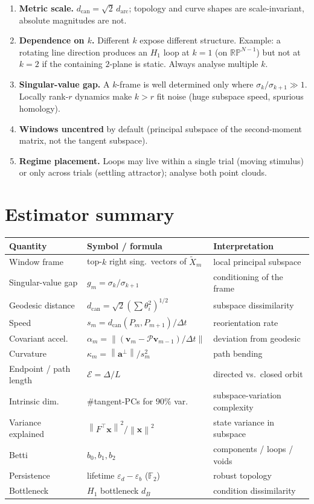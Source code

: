 \documentclass[11pt]{article}
\newcommand{\RP}{\mathbb{RP}}
\newcommand{\Fld}{\mathbb{F}}
\newcommand{\PT}{\mathcal{P}}
\newcommand{\norm}[1]{\left\lVert #1 \right\rVert}
\theoremstyle{definition}
\begin{document}
\begin{enumerate}[leftmargin=1.4em]
\item \textbf{Metric scale.} $d_{\mathrm{can}}=\sqrt2\,d_{\mathrm{arc}}$; topology and
curve shapes are scale-invariant, absolute magnitudes are not.
\item \textbf{Dependence on $k$.} Different $k$ expose different structure.
Example: a rotating line direction produces an $H_1$ loop at $k=1$ (on $\RP^{N-1}$)
but not at $k=2$ if the containing $2$-plane is static. Always analyse multiple $k$.
\item \textbf{Singular-value gap.} A $k$-frame is well determined only where
$\sigma_k/\sigma_{k+1}\gg1$. Locally rank-$r$ dynamics make $k>r$ fit noise (huge
subspace speed, spurious homology).
\item \textbf{Windows uncentred} by default (principal subspace of the second-moment
matrix, not the tangent subspace).
\item \textbf{Regime placement.} Loops may live within a single trial (moving
stimulus) or only across trials (settling attractor); analyse both point clouds.
\end{enumerate}

\section*{Estimator summary}
\begin{center}
\small
\begin{tabular}{@{}lll@{}}
\toprule
Quantity & Symbol / formula & Interpretation \\
\midrule
Window frame & top-$k$ right sing.\ vectors of $\tilde X_m$ & local principal subspace \\
Singular-value gap & $g_m=\sigma_k/\sigma_{k+1}$ & conditioning of the frame \\
Geodesic distance & $d_{\mathrm{can}}=\sqrt2(\sum\theta_i^2)^{1/2}$ & subspace dissimilarity \\
Speed & $s_m=d_{\mathrm{can}}(P_m,P_{m+1})/\Delta t$ & reorientation rate \\
Covariant accel. & $\alpha_m=\norm{(\bm v_m-\PT\bm v_{m-1})/\Delta t}$ & deviation from geodesic \\
Curvature & $\kappa_m=\norm{\bm a^\perp}/s_m^2$ & path bending \\
Endpoint / path length & $\mathcal E=\Delta/L$ & directed vs.\ closed orbit \\
Intrinsic dim. & \#tangent-PCs for $90\%$ var. & subspace-variation complexity \\
Variance explained & $\norm{F^\top\bm x}^2/\norm{\bm x}^2$ & state variance in subspace \\
Betti & $b_0,b_1,b_2$ & components / loops / voids \\
Persistence & lifetime $\varepsilon_d-\varepsilon_b$ ($\Fld_2$) & robust topology \\
Bottleneck & $H_1$ bottleneck $d_B$ & condition dissimilarity \\
\bottomrule
\end{tabular}
\end{center}
\end{document}
